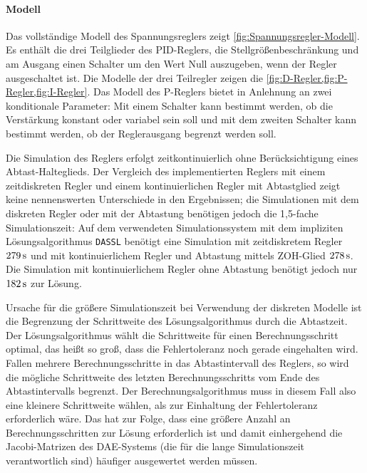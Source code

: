 \paragraph{Modell}\label{modell-Regler}
Das vollständige Modell des Spannungsreglers zeigt \cref{fig:Spannungsregler-Modell}. Es enthält die drei Teilglieder des PID-Reglers, die Stellgrößenbeschränkung und am Ausgang einen Schalter um den Wert Null auszugeben, wenn der Regler ausgeschaltet ist. Die Modelle der drei Teilregler zeigen die \cref{fig:D-Regler,fig:P-Regler,fig:I-Regler}. Das Modell des P-Reglers bietet in Anlehnung an \cite{pillerpowersystemsDigitalerSpannungsreglerSoftwaredokumentation1997} zwei konditionale Parameter: Mit einem Schalter kann bestimmt werden, ob die Verstärkung konstant oder variabel sein soll und mit dem zweiten Schalter kann bestimmt werden, ob der Reglerausgang begrenzt werden soll. 

Die Simulation des Reglers erfolgt zeitkontinuierlich ohne Berücksichtigung eines Abtast-Halteglieds. Der Vergleich des implementierten Reglers mit einem zeitdiskreten Regler und einem kontinuierlichen Regler mit Abtastglied zeigt keine nennenswerten Unterschiede in den Ergebnissen; die Simulationen mit dem diskreten Regler oder mit der Abtastung benötigen jedoch die 1,5-fache Simulationszeit: Auf dem verwendeten Simulationssystem mit dem impliziten Lösungsalgorithmus \texttt{DASSL} benötigt eine Simulation mit zeitdiskretem Regler $\unit[279]{s}$ und mit kontinuierlichem Regler und Abtastung mittels ZOH-Glied $\unit[278]{s}$.  Die Simulation mit kontinuierlichem Regler ohne Abtastung benötigt jedoch nur $\unit[182]{s}$ zur Lösung. 

Ursache für die größere Simulationszeit bei Verwendung der diskreten Modelle ist die Begrenzung der Schrittweite des Lösungsalgorithmus durch die Abtastzeit. Der Lösungsalgorithmus wählt die Schrittweite für einen Berechnungsschritt optimal, das heißt so groß, dass die Fehlertoleranz noch gerade eingehalten wird. Fallen mehrere Berechnungsschritte in das Abtastintervall des Reglers, so wird die mögliche Schrittweite des letzten Berechnungsschritts vom Ende des Abtastintervalls begrenzt. Der Berechnungsalgorithmus muss in diesem Fall also eine kleinere Schrittweite wählen, als zur Einhaltung der Fehlertoleranz erforderlich wäre. Das hat zur Folge, dass eine größere Anzahl an Berechnungsschritten zur Lösung erforderlich ist und damit einhergehend die Jacobi-Matrizen des DAE-Systems (die für die lange Simulationszeit verantwortlich sind) häufiger ausgewertet werden müssen. 

